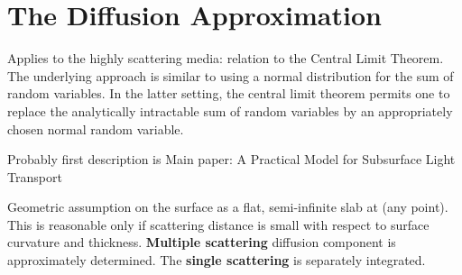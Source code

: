 \section{The Diffusion Approximation}
Applies to the highly scattering media: relation to the Central Limit Theorem.
The underlying approach is similar to using a normal distribution for the sum of random variables.
In the latter setting, the central limit theorem permits one to replace the analytically intractable
sum of random variables by an appropriately chosen normal random variable.

Probably first description is \cite{Stam1995}
Main paper: A Practical Model for Subsurface Light Transport \cite{Jensen:2001:PMS:383259.383319}

Geometric assumption on the surface as a flat, semi-infinite slab at (any
point). This is reasonable only if scattering distance is small with respect to
surface curvature and thickness. \textbf{Multiple scattering} diffusion
component is approximately determined. The \textbf{single scattering} is
separately integrated.